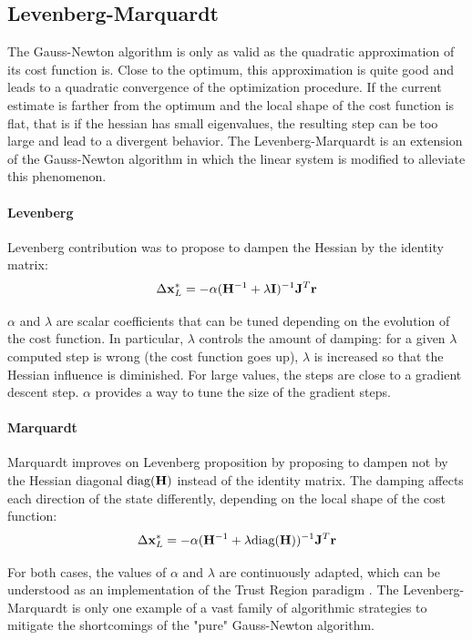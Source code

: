 \subsection{Levenberg-Marquardt}
The Gauss-Newton algorithm is only as valid as the quadratic approximation of its cost function is. Close to the optimum, this approximation
is quite good and leads to a quadratic convergence of the optimization procedure. If the current estimate is farther from the optimum and the
local shape of the cost function is flat, that is if the hessian has small eigenvalues, the resulting step can be too large and lead to a 
divergent behavior. The Levenberg-Marquardt is an extension of the Gauss-Newton algorithm in which the linear system  is modified
to alleviate this phenomenon.

\paragraph{Levenberg}
Levenberg \cite{levenberg1944method} contribution was to propose to dampen the Hessian by the identity matrix:
%
\begin{equation}
    \Delta {\bf x}_{L}^* = - \alpha ({\bf H}^{-1} + \lambda {\bf I})^{-1} {\bf J}^T {\bf r}
\end{equation}
%

$\alpha$ and $\lambda$ are scalar coefficients that can be tuned depending on the evolution of the cost function. 
In particular, $\lambda$ controls the amount of damping: for a given $\lambda$ computed step is wrong (the cost function goes up),
$\lambda$ is increased so that the Hessian influence is diminished. For large values, the steps are close to a gradient descent step.
$\alpha$ provides a way to tune the size of the gradient steps.

\paragraph{Marquardt}
Marquardt \cite{marquardt1963algorithm} improves on Levenberg proposition by proposing to dampen not by the Hessian diagonal $\text{diag}({\bf H})$
instead of the identity matrix. The damping affects each direction of the state differently, depending on the local shape of the cost function:
%
\begin{equation}
    \Delta {\bf x}_{L}^* = - \alpha ({\bf H}^{-1} + \lambda \text{diag}({\bf H}))^{-1} {\bf J}^T {\bf r}
\end{equation}
%

For both cases, the values of $\alpha$ and $\lambda$ are continuously adapted, which can be understood as an implementation of the 
Trust Region paradigm \cite{boyd2004convex}. The Levenberg-Marquardt is only one example of a vast family of algorithmic strategies 
to mitigate the shortcomings of the "pure" Gauss-Newton algorithm.

